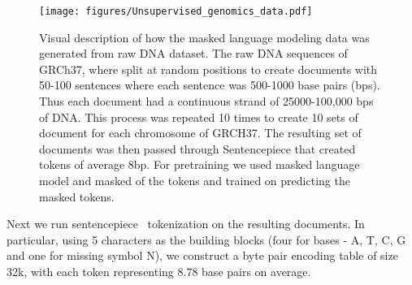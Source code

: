 \documentclass{article}
\begin{document}
\begin{figure}
    \centering
    \texttt{[image: figures/Unsupervised\_genomics\_data.pdf]}
    \caption{Visual description of how the masked language modeling data was generated from raw DNA dataset. The raw DNA sequences of GRCh37, where split at random positions to create documents with 50-100 sentences where each sentence was 500-1000 base pairs (bps). Thus each document had a continuous strand of 25000-100,000 bps of DNA. This process was repeated 10 times to create 10 sets of document for each chromosome of GRCH37. The resulting set of documents was then passed through Sentencepiece that created tokens of average 8bp. For pretraining we used masked language model and masked  of the tokens and trained on predicting the masked tokens.}
    \label{fig:apndx_mlm_data}
\end{figure}

Next we run sentencepiece~\citep{kudo2018sentencepiece} tokenization on the resulting documents. In particular, using 5 characters as the building blocks (four for bases - A, T, C, G and one for missing symbol N), we construct a byte pair encoding table of size 32k, with each token representing 8.78 base pairs on average.
\end{document}
